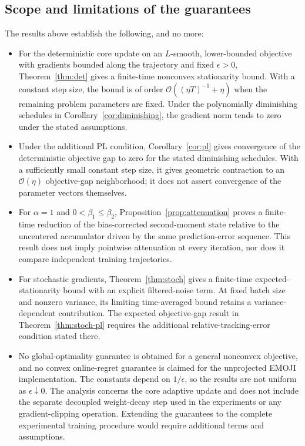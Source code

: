 \documentclass[11pt]{article}
\newcommand{\cO}{\mathcal{O}}
\begin{document}
\subsection{Scope and limitations of the guarantees}
The results above establish the following, and no more:
\begin{itemize}
 \item For the deterministic core update on an $L$-smooth, lower-bounded objective with gradients bounded along the trajectory and fixed $\epsilon>0$, Theorem~\ref{thm:det} gives a finite-time nonconvex stationarity bound. With a constant step size, the bound is of order $\cO((\eta T)^{-1}+\eta)$ when the remaining problem parameters are fixed. Under the polynomially diminishing schedules in Corollary~\ref{cor:diminishing}, the gradient norm tends to zero under the stated assumptions.
 \item Under the additional PL condition, Corollary~\ref{cor:pl} gives convergence of the deterministic objective gap to zero for the stated diminishing schedules. With a sufficiently small constant step size, it gives geometric contraction to an $\cO(\eta)$ objective-gap neighborhood; it does not assert convergence of the parameter vectors themselves.
 \item For $\alpha=1$ and $0<\beta_1\leq\beta_2$, Proposition~\ref{prop:attenuation} proves a finite-time reduction of the bias-corrected second-moment state relative to the uncentered accumulator driven by the same prediction-error sequence. This result does not imply pointwise attenuation at every iteration, nor does it compare independent training trajectories.
 \item For stochastic gradients, Theorem~\ref{thm:stoch} gives a finite-time expected-stationarity bound with an explicit filtered-noise term. At fixed batch size and nonzero variance, its limiting time-averaged bound retains a variance-dependent contribution. The expected objective-gap result in Theorem~\ref{thm:stoch-pl} requires the additional relative-tracking-error condition stated there.
 \item No global-optimality guarantee is obtained for a general nonconvex objective, and no convex online-regret guarantee is claimed for the unprojected EMOJI implementation. The constants depend on $1/\epsilon$, so the results are not uniform as $\epsilon\downarrow0$. The analysis concerns the core adaptive update and does not include the separate decoupled weight-decay step used in the experiments or any gradient-clipping operation. Extending the guarantees to the complete experimental training procedure would require additional terms and assumptions.
\end{itemize}
\end{document}
